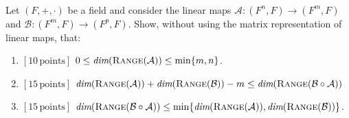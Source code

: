 \documentclass[fleqn, 10.5pt, a4paper]{article}
\theoremstyle{definition}
\numberwithin{equation}{section}
\renewcommand{\dim}{{\mbox{\em dim}}}
\newcommand{\range}{{\mbox{\sc Range}}}
\begin{document}
\clearpage

\\
Let $(F, +, \cdot)$ be a field and consider the linear maps $\mathcal{A} : (F^n, F) \rightarrow (F^m, F)$ and  $\mathcal{B} : (F^m, F) \rightarrow (F^p, F)$. Show, without using the matrix representation of linear maps, that:

\begin{enumerate}
	\item {\bf$[10\, \text{points}]$} $0 \leq \dim(\range(\mathcal{A})) \leq \min\{m, n\}$.
	\item {\bf$[15\, \text{points}]$} $\dim(\range(\mathcal{A})) + \dim(\range(\mathcal{B})) - m \leq \dim(\range(\mathcal{B}\circ\mathcal{A}))$
	\item {\bf$[15\, \text{points}]$} $\dim(\range(\mathcal{B}\circ\mathcal{A})) \leq \min\{\dim(\range(\mathcal{A})),\dim(\range(\mathcal{B}))\}$. 
\end{enumerate}
\end{document}
